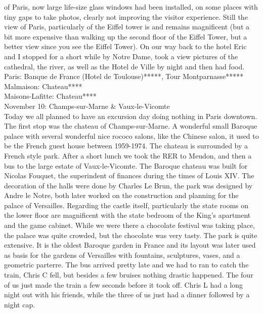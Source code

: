 of Paris, now large life-size glass windows had been installed, on some places with tiny gaps to take photos, clearly not improving the visitor experience. Still the view of Paris, particularly of the Eiffel tower is and remains magnificent (but a bit more expensive than walking up the second floor of the Eiffel Tower, but a better view since you see the Eiffel Tower). On our way back to the hotel Eric and I stopped for a short while by Notre Dame, took a view pictures of the cathedral, the river, as well as the Hotel de Ville by night and then had food.\\

Paris: Banque de France (Hotel de Toulouse)*****, Tour Montparnasse*****\\
Malmaison: Chateau****\\
Maisons-Lafitte: Chateau****\\

November 10: Champs-sur-Marne \& Vaux-le-Vicomte\\
Today we all planned to have an excursion day doing nothing in Paris downtown. The first stop was the chateau of Champs-sur-Marne. A wonderful small Baroque palace with several wonderful nice rococo salons, like the Chinese salon, it used to be the French guest house between 1959-1974. The chateau is surrounded by a French style park. After a short lunch we took the RER to Meudon, and then a bus to the large estate of Vaux-le-Vicomte. The Baroque chateau was built for Nicolas Fouquet, the superindent of finances during the times of Louis XIV. The decoration of the halls were done by Charles Le Brun, the park was designed by Andre le Notre, both later worked on the construction and planning for the palace of Versailles. Regarding the castle itself, particularly the state rooms on the lower floor are magnificent with the state bedroom of the King's apartment and the game cabinet. While we were there a chocolate festival was taking place, the palace was quite crowded, but the chocolate was very tasty. The park is quite extensive. It is the oldest Baroque garden in France and its layout was later used as basis for the gardens of Versailles with fountains, sculptures, vases, and a geometric parterre. The bus arrived pretty late and we had to ran to catch the train, Chris C fell, but besides a few bruises nothing drastic happened. The four of us just made the train a few seconds before it took off. Chris L had a long night out with his friends, while the three of us just had a dinner followed by a night cap.\\


